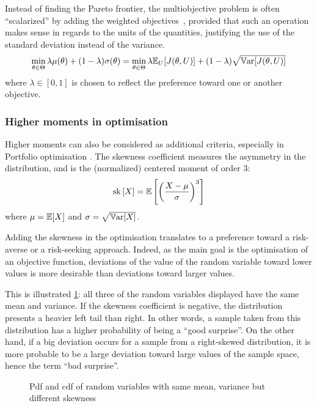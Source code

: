\documentclass[../../Main_ManuscritThese.tex]{subfiles}
\newcommand\imgpath{/home/victor/acadwriting/Manuscrit/Text/Chapter3/img/}
\begin{document}
Instead of finding the Pareto frontier, the multiobjective problem is
often ``scalarized'' by adding the weighted
objectives~\citep{marler_weighted_2010}, provided that such an
operation makes sense in regards to the units of the quantities,
justifying the use of the standard deviation instead of the variance.
\begin{equation}
  \min_{\theta\in\Theta} \lambda \mu(\theta) + (1- \lambda)\sigma(\theta) =   \min_{\theta\in\Theta} \lambda \mathbb{E}_{U}[J(\theta,U)] + (1- \lambda)\sqrt{\mathbb{V}\mathrm{ar}[J(\theta,U)]}
\end{equation}
where $\lambda \in [0,1]$ is chosen to reflect the preference toward one or another objective.

\subsubsection{Higher moments in optimisation}
\label{sec:higher_moments}
Higher moments can also be considered as additional criteria,
especially in Portfolio optimisation
\citep{lai_mean-variance-skewness-kurtosis-based_2006,briec_mean-variance-skewness_2007}.
The skewness coefficient measures the asymmetry in the distribution,
and is the (normalized) centered moment of order $3$:
\begin{equation}
  \mathrm{sk}\left[X\right] = \mathbb{E}\left[\left(\frac{X - \mu}{\sigma}\right)^3\right]
\end{equation}
where $\mu = \mathbb{E}[X]$ and $\sigma = \sqrt{\mathbb{V}\mathrm{ar}[X]}$.

Adding the skewness in the optimisation translates to a preference
toward a risk-averse or a risk-seeking approach. Indeed, as the main
goal is the optimisation of an objective function, deviations of the
value of the random variable toward lower values is more desirable
than deviations toward larger values.

This is illustrated \cref{fig:skewness_example}: all three of the
random variables displayed have the same mean and variance.  If the
skewness coefficient is negative, the distribution presents a heavier
left tail than right. In other words, a sample taken from this
distribution has a higher probability of being a ``good surprise''. On
the other hand, if a big deviation occurs for a sample from a
right-skewed distribution, it is more probable to be a large deviation
toward large values of the sample space, hence the term ``bad
surprise''.

\begin{figure}[ht]
  \centering
  
  \caption[Influence of the skewness]{\label{fig:skewness_example} Pdf and cdf of random variables with same mean, variance but different skewness}
\end{figure}
\end{document}
